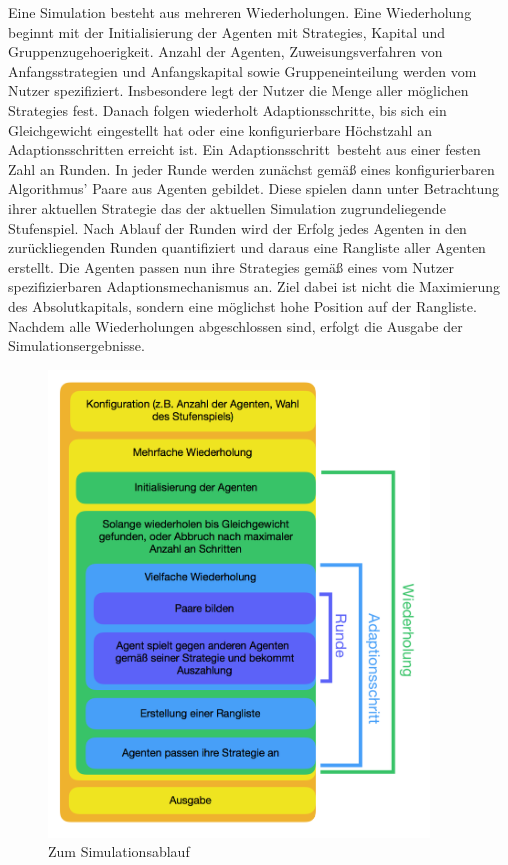 \documentclass[parskip=full,11pt]{scrartcl}
\def\adapt{Adaptionsschritt}
\def\adapts{Adaptionsschritte}
\begin{document}
Eine Simulation besteht aus mehreren Wiederholungen. Eine Wiederholung beginnt mit der Initialisierung der Agenten mit \Glspl{Strategie}, \Gls{Kapital} und \Gls{Gruppenzugehoerigkeit}. Anzahl der Agenten, Zuweisungsverfahren von Anfangsstrategien und Anfangskapital sowie Gruppeneinteilung werden vom \Gls{Nutzer} spezifiziert. Insbesondere legt der \Gls{Nutzer} die Menge aller möglichen \Glspl{Strategie} fest. Danach folgen wiederholt \adapts, bis sich ein \Gls{Gleichgewicht} eingestellt hat oder eine konfigurierbare Höchstzahl an \adapts n erreicht ist. Ein \adapt\ besteht aus einer festen Zahl an Runden. In jeder Runde werden zunächst gemäß eines konfigurierbaren Algorithmus' Paare aus Agenten gebildet. Diese spielen dann unter Betrachtung ihrer aktuellen \Gls{Strategie} das der aktuellen Simulation zugrundeliegende \Gls{Stufenspiel}. Nach Ablauf der Runden wird der \Gls{Erfolg} jedes Agenten in den zurückliegenden Runden quantifiziert und daraus eine Rangliste aller Agenten erstellt. Die Agenten passen nun ihre \Glspl{Strategie} gemäß eines vom \Gls{Nutzer} spezifizierbaren Adaptionsmechanismus an. Ziel dabei ist nicht die Maximierung des Absolutkapitals, sondern eine möglichst hohe Position auf der Rangliste.\newline
Nachdem alle Wiederholungen abgeschlossen sind, erfolgt die Ausgabe der Simulationsergebnisse.

\begin{figure}
	\centering
	\includegraphics[width=0.9\textwidth]{images/Schema.png}
	\caption{\label{fig:schema}
		Zum Simulationsablauf}
\end{figure}
\end{document}
